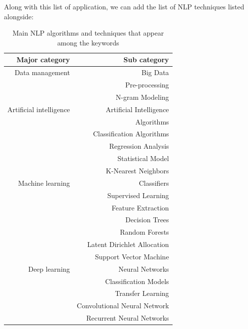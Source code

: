 Along with this list of application, we can add the list of NLP techniques listed alongside:
\begin{table}[bp]
    \centering
    \begin{tabular}{rr}
        Major category          & Sub category                 \\ [0.5ex]
        \toprule
        Data management         & Big Data                     \\
                                & Pre-processing               \\
                                & N-gram Modeling              \\
        Artificial intelligence & Artificial Intelligence      \\
                                & Algorithms                   \\
                                & Classification Algorithms    \\
                                & Regression Analysis          \\
                                & Statistical Model            \\
                                & K-Nearest Neighbors          \\
        Machine learning        & Classifiers                  \\
                                & Supervised Learning          \\
                                & Feature Extraction           \\
                                & Decision Trees               \\
                                & Random Forests               \\
                                & Latent Dirichlet Allocation  \\
                                & Support Vector Machine       \\
        Deep learning           & Neural Networks              \\
                                & Classification Models        \\
                                & Transfer Learning            \\
                                & Convolutional Neural Network \\
                                & Recurrent Neural Networks    \\
        \bottomrule
    \end{tabular}
    \caption{Main NLP algorithms and techniques that appear among the keywords}
    \label{table:nlp-tools}
\end{table}

